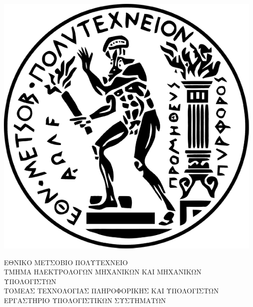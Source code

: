 \documentclass[a4paper,twoside,titlepage,11pt]{book}
\begin{document}
\maketitle
\pagestyle{empty}
\newpage
\frontmatter

\hspace{10pt}
\frontmatter
\setcounter{page}{1}
\pagestyle{plain}
\hspace{10pt}
\begin{center}
\includegraphics[scale=0.15]{logo.png}

\Large{Ε}\large{ΘΝΙΚΟ}
\Large{Μ}\large{ΕΤΣΟΒΙΟ}
\Large{Π}\large{ΟΛΥΤΕΧΝΕΙΟ} \\
\normalsize{Τ}\small{ΜΗΜΑ}
\normalsize{Η}\small{ΛΕΚΤΡΟΛΟΓΩΝ}
\normalsize{Μ}\small{ΗΧΑΝΙΚΩΝ}
\normalsize{Κ}\small{ΑΙ}
\normalsize{Μ}\small{ΗΧΑΝΙΚΩΝ}
\normalsize{Υ}\small{ΠΟΛΟΓΙΣΤΩΝ} \\
\vspace{2ex}
ΤΟΜΕΑΣ ΤΕΧΝΟΛΟΓΙΑΣ ΠΛΗΡΟΦΟΡΙΚΗΣ ΚΑΙ ΥΠΟΛΟΓΙΣΤΩΝ \\
ΕΡΓΑΣΤΗΡΙΟ ΥΠΟΛΟΓΙΣΤΙΚΩΝ ΣΥΣΤΗΜΑΤΩΝ \\
\end{center}
\end{document}
